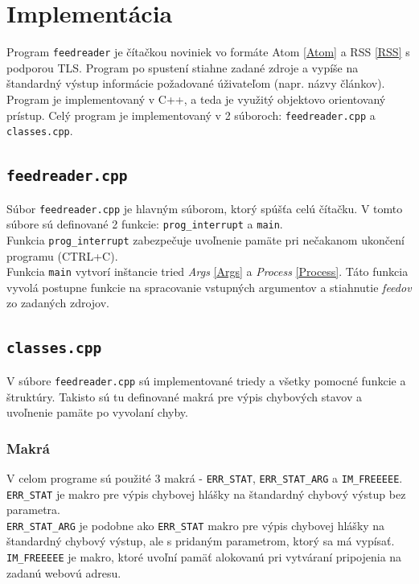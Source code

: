 \documentclass[a4paper, 11pt]{article}
\begin{document}
    \section{Implementácia}
    \label{implementation}

    Program \texttt{feedreader} je čítačkou noviniek vo formáte Atom \ref{Atom} a RSS \ref{RSS} s podporou TLS. Program po spustení stiahne zadané zdroje a vypíše na štandardný výstup informácie požadované úživateľom (napr. názvy článkov). \\
    
    Program je implementovaný v C++, a teda je využitý objektovo orientovaný prístup. Celý program je implementovaný v 2 súboroch: \texttt{feedreader.cpp} a \texttt{classes.cpp}.

    \subsection{\texttt{feedreader.cpp}}
    \label{feedreader}
    Súbor \texttt{feedreader.cpp} je hlavným súborom, ktorý spúšťa celú čítačku. V tomto súbore sú definované 2 funkcie: \texttt{prog\_interrupt} a \texttt{main}. \\
    Funkcia \texttt{prog\_interrupt} zabezpečuje uvoľnenie pamäte pri nečakanom ukončení programu (CTRL+C). \\
    
    Funkcia \texttt{main} vytvorí inštancie tried \textit{Args} \ref{Args} a \textit{Process} \ref{Process}. Táto funkcia vyvolá postupne funkcie na spracovanie vstupných argumentov a stiahnutie \textit{feedov} zo zadaných zdrojov.\\

    \subsection{\texttt{classes.cpp}}
    \label{classes}
	V súbore \texttt{feedreader.cpp} sú implementované triedy a všetky pomocné funkcie a štruktúry. Takisto sú tu definované makrá pre výpis chybových stavov a uvoľnenie pamäte po vyvolaní chyby.
	
    \subsubsection{Makrá}
    \label{macros}
    V celom programe sú použité 3 makrá - \texttt{ERR\_STAT}, \texttt{ERR\_STAT\_ARG} a \texttt{IM\_FREEEEE}. \\
    \texttt{ERR\_STAT} je makro pre výpis chybovej hlášky na štandardný chybový výstup bez parametra. \\
    \texttt{ERR\_STAT\_ARG} je podobne ako \texttt{ERR\_STAT} makro pre výpis chybovej hlášky na štandardný chybový výstup, ale s pridaným parametrom, ktorý sa má vypísať. \\
    \texttt{IM\_FREEEEE} je makro, ktoré uvoľní pamäť alokovanú pri vytváraní pripojenia na zadanú webovú adresu. \\
	
\end{document}
